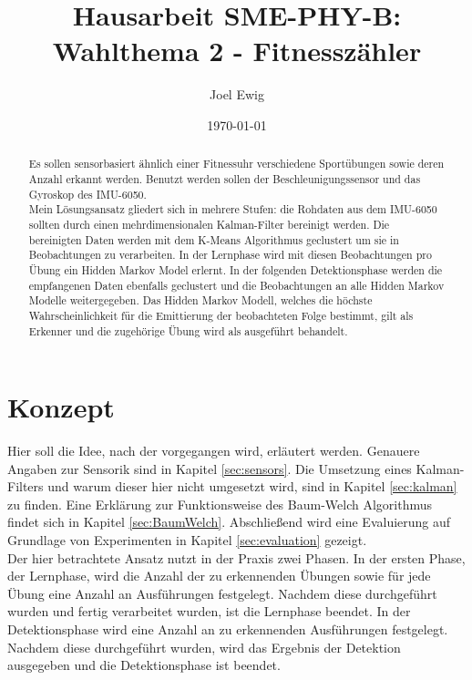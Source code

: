 \documentclass{article}
\begin{document}
\title{Hausarbeit SME-PHY-B: Wahlthema 2 - Fitnesszähler}
\author{Joel Ewig}
\date{\today}
\maketitle
\clearpage

\begin{abstract}
Es sollen sensorbasiert ähnlich einer Fitnessuhr verschiedene Sportübungen sowie deren Anzahl erkannt werden.
Benutzt werden sollen der Beschleunigungssensor und das Gyroskop des IMU-6050.\\
Mein Lösungsansatz gliedert sich in mehrere Stufen:
die Rohdaten aus dem IMU-6050 sollten durch einen mehrdimensionalen Kalman-Filter bereinigt werden.
Die bereinigten Daten werden mit dem K-Means Algorithmus geclustert um sie in Beobachtungen zu verarbeiten.
In der Lernphase wird mit diesen Beobachtungen pro Übung ein Hidden Markov Model erlernt.
In der folgenden Detektionsphase werden die empfangenen Daten ebenfalls geclustert und die Beobachtungen an alle Hidden Markov Modelle weitergegeben.
Das Hidden Markov Modell, welches die höchste Wahrscheinlichkeit für die Emittierung der beobachteten Folge bestimmt, gilt als Erkenner und die zugehörige Übung wird als ausgeführt behandelt.
\end{abstract}
\clearpage

\tableofcontents
\clearpage

\section{Konzept}
\label{sec:concept}
Hier soll die Idee, nach der vorgegangen wird, erläutert werden.
Genauere Angaben zur Sensorik sind in Kapitel \ref{sec:sensors}.
Die Umsetzung eines Kalman-Filters und warum dieser hier nicht umgesetzt wird, sind in Kapitel \ref{sec:kalman} zu finden.
Eine Erklärung zur Funktionsweise des Baum-Welch Algorithmus findet sich in Kapitel \ref{sec:BaumWelch}.
Abschließend wird eine Evaluierung auf Grundlage von Experimenten in Kapitel \ref{sec:evaluation} gezeigt.\\
Der hier betrachtete Ansatz nutzt in der Praxis zwei Phasen.
In der ersten Phase, der Lernphase, wird die Anzahl der zu erkennenden Übungen sowie für jede Übung eine Anzahl an Ausführungen festgelegt.
Nachdem diese durchgeführt wurden und fertig verarbeitet wurden, ist die Lernphase beendet.
In der Detektionsphase wird eine Anzahl an zu erkennenden Ausführungen festgelegt.
Nachdem diese durchgeführt wurden, wird das Ergebnis der Detektion ausgegeben und die Detektionsphase ist beendet.
\end{document}
